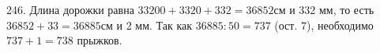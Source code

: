 246. Длина дорожки равна $33200+3320+332=36852$см и 332 мм, то есть $36852+33=36885$см и 2 мм. Так как $36885:50=737$ (ост. 7), необходимо $737+1=738$ прыжков.\\
